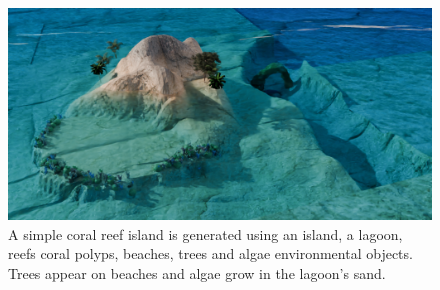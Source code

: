 \begin{figure}
    \includegraphics{Figures/CoralIsland/multiScene1 v2 final 1.png}
    \caption{A simple coral reef island is generated using an island, a lagoon, reefs coral polyps, beaches, trees and algae environmental objects. Trees appear on beaches and algae grow in the lagoon's sand. }
    \label{fig:env-obj_coral-island-scene}
\end{figure}
